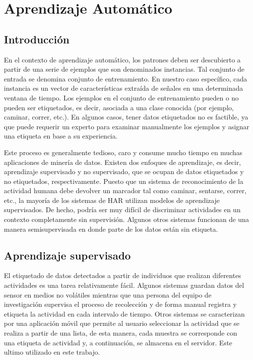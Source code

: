 
\chapter{Aprendizaje Automático}
\label{chap:Aprendizaje-Automatico}

\section{Introducción}
En el contexto de aprendizaje automático, los patrones deben ser descubierto a partir de una serie de ejemplos que son denominados instancias. Tal conjunto de entrada se denomina conjunto de entrenamiento. En nuestro caso específico, cada instancia es un vector de características extraída de señales en una determinada ventana de tiempo. Los ejemplos en el conjunto de entrenamiento pueden o no pueden ser etiquetados, es decir, asociada a una clase conocida (por ejemplo, caminar, correr, etc.). En algunos casos, tener datos etiquetados no es factible, ya que puede requerir un experto para examinar manualmente los ejemplos y asignar una etiqueta en base a su experiencia.

Este proceso es generalmente tedioso, caro y consume mucho tiempo en muchas aplicaciones de minería de datos. Existen dos enfoques de aprendizaje, es decir, aprendizaje supervisado y no supervisado, que se ocupan de datos etiquetados y no etiquetados, respectivamente. Puesto que un sistema de reconocimiento de la actividad humana debe devolver un marcador tal como caminar, sentarse, correr, etc., la mayoría de los sistemas de HAR utilizan modelos de aprendizaje supervisados. De hecho, podría ser muy difícil de discriminar actividades en un contexto completamente sin supervisión. Algunos otros sistemas funcionan de una manera semisupervisada en donde parte de los datos están sin etiqueta.

\section{Aprendizaje supervisado}
El etiquetado de datos detectados a partir de individuos que realizan diferentes actividades es una tarea relativamente fácil.
Algunos sistemas guardan datos del sensor en medios no volátiles mientras que una persona del equipo de investigación supervisa el proceso de recolección y de forma manual registra y etiqueta la actividad en cada intervalo de tiempo. Otros sistemas se caracterizan por una aplicación móvil que permite al usuario seleccionar la actividad que se realiza a partir de una lista, de esta manera, cada muestra se corresponde con una etiqueta de actividad y, a continuación, se almacena en el servidor. Este ultimo utilizado en este trabajo.

